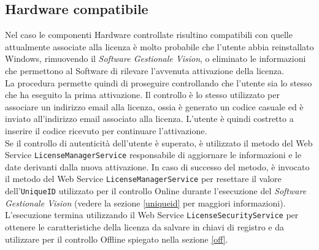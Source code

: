 \subsection{Hardware compatibile}
\label{hc}
Nel caso le componenti Hardware controllate risultino compatibili con quelle attualmente associate alla licenza è molto probabile che l'utente abbia reinstallato Windows, rimuovendo il \textit{Software Gestionale Vision}, o eliminato le informazioni che permettono al Software di rilevare l'avvenuta attivazione della licenza. 
\\La procedura permette quindi di proseguire controllando che l'utente sia lo stesso che ha eseguito la prima attivazione. Il controllo è lo stesso utilizzato per associare un indirizzo email alla licenza, ossia è generato un codice casuale ed è inviato all'indirizzo email associato alla licenza. L'utente è quindi costretto a inserire il codice ricevuto per continuare l'attivazione.
\\Se il controllo di autenticità dell'utente è superato, è utilizzato il metodo del Web Service \texttt{LicenseManagerService} responsabile di aggiornare le informazioni e le date derivanti dalla nuova attivazione. In caso di successo del metodo, è invocato il metodo del Web Service \texttt{LicenseManagerService} per resettare il valore dell’\texttt{UniqueID} utilizzato per il controllo Online durante l’esecuzione del \textit{Software Gestionale Vision} (vedere la sezione \ref{uniqueid} per maggiori informazioni).\\
L’esecuzione termina utilizzando il Web Service \texttt{LicenseSecurityService} per ottenere le caratteristiche della licenza da salvare in chiavi di registro e da utilizzare per il controllo Offline spiegato nella sezione \ref{off}. 


